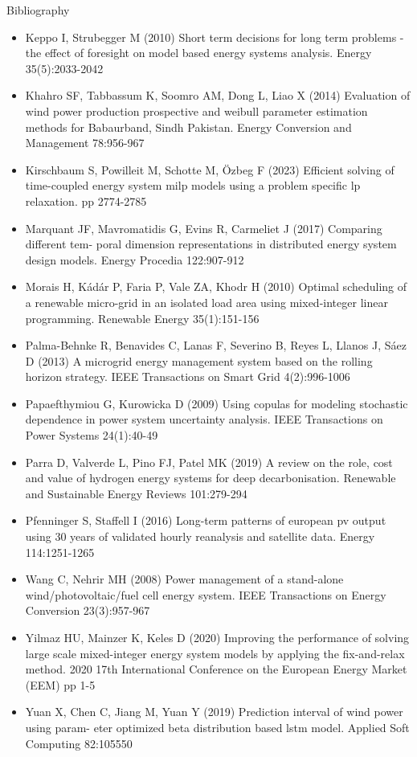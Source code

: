 \documentclass[pdf]{beamer}
\begin{document}
  \begin{frame}{Bibliography}
    \tiny
    \begin{itemize}
      \item Keppo I, Strubegger M (2010) Short term decisions for long term problems - the effect of
      foresight on model based energy systems analysis. Energy 35(5):2033-2042
      \item Khahro SF, Tabbassum K, Soomro AM, Dong L, Liao X (2014) Evaluation of wind power
      production prospective and weibull parameter estimation methods for Babaurband,
      Sindh Pakistan. Energy Conversion and Management 78:956-967
      \item Kirschbaum S, Powilleit M, Schotte M, \"{O}zbeg F (2023) Efficient solving of time-coupled
      energy system milp models using a problem specific lp relaxation. pp 2774-2785
      \item Marquant JF, Mavromatidis G, Evins R, Carmeliet J (2017) Comparing different tem-
      poral dimension representations in distributed energy system design models. Energy
      Procedia 122:907-912
      \item Morais H, K\'{a}d\'{a}r P, Faria P, Vale ZA, Khodr H (2010) Optimal scheduling of a renewable
      micro-grid in an isolated load area using mixed-integer linear programming. Renewable
      Energy 35(1):151-156
      \item Palma-Behnke R, Benavides C, Lanas F, Severino B, Reyes L, Llanos J, S\'{a}ez D (2013)
      A microgrid energy management system based on the rolling horizon strategy. IEEE
      Transactions on Smart Grid 4(2):996-1006
      \item Papaefthymiou G, Kurowicka D (2009) Using copulas for modeling stochastic dependence in
      power system uncertainty analysis. IEEE Transactions on Power Systems 24(1):40-49
      \item Parra D, Valverde L, Pino FJ, Patel MK (2019) A review on the role, cost and value of
      hydrogen energy systems for deep decarbonisation. Renewable and Sustainable Energy
      Reviews 101:279-294
      \item Pfenninger S, Staffell I (2016) Long-term patterns of european pv output using 30 years
      of validated hourly reanalysis and satellite data. Energy 114:1251-1265
      \item Wang C, Nehrir MH (2008) Power management of a stand-alone wind/photovoltaic/fuel cell
      energy system. IEEE Transactions on Energy Conversion 23(3):957-967
      \item Yilmaz HU, Mainzer K, Keles D (2020) Improving the performance of solving large scale
      mixed-integer energy system models by applying the fix-and-relax method. 2020 17th
      International Conference on the European Energy Market (EEM) pp 1-5
      \item Yuan X, Chen C, Jiang M, Yuan Y (2019) Prediction interval of wind power using param-
      eter optimized beta distribution based lstm model. Applied Soft Computing 82:105550
    \end{itemize}
  \end{frame}
\end{document}
